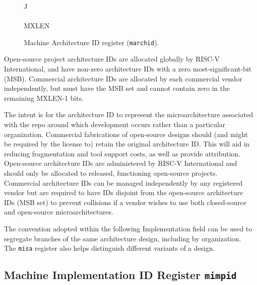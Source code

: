 \begin{figure*}[h!]
{\footnotesize
\begin{center}
\begin{tabular}{J}
 \\
\hline
{} \\
\hline
MXLEN \\
\end{tabular}
\end{center}
}
\vspace{-0.1in}
\caption{Machine Architecture ID register ({\tt marchid}).}
\label{marchreg}
\end{figure*}

Open-source project architecture IDs are allocated globally by
RISC-V International, and have non-zero architecture IDs with a zero
most-significant-bit (MSB).  Commercial architecture IDs are allocated
by each commercial vendor independently, but must have the MSB set and
cannot contain zero in the remaining MXLEN-1 bits.

\begin{commentary}
The intent is for the architecture ID to represent the
microarchitecture associated with the repo around which development
occurs rather than a particular organization.  Commercial fabrications
of open-source designs should (and might be required by the license
to) retain the original architecture ID.  This will aid in reducing
fragmentation and tool support costs, as well as provide attribution.
Open-source architecture IDs are administered by RISC-V International
and should only be allocated to released, functioning open-source
projects.  Commercial architecture IDs can be managed independently by
any registered vendor but are required to have IDs disjoint from the
open-source architecture IDs (MSB set) to prevent collisions if a
vendor wishes to use both closed-source and open-source
microarchitectures.

The convention adopted within the following Implementation field can
be used to segregate branches of the same architecture design,
including by organization.  The {\tt misa} register also helps
distinguish different variants of a design.
\end{commentary}

\subsection{Machine Implementation ID Register {\tt mimpid}}

